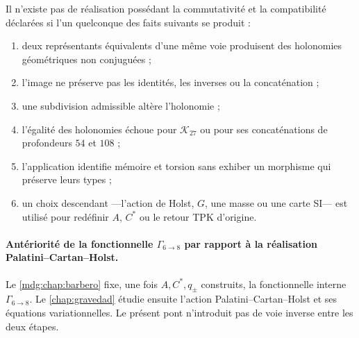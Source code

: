 \begin{criterion}
\label{crit:puente-tpk-cartan}
Il n'existe pas de réalisation possédant la commutativité et la compatibilité déclarées
si l'un quelconque des faits suivants se produit :
\begin{enumerate}
 \item deux représentants équivalents d'une même voie produisent
 des holonomies géométriques non conjuguées ;
 \item l'image ne préserve pas les identités, les inverses ou la concaténation ;
 \item une subdivision admissible altère l'holonomie ;
 \item l'égalité des holonomies échoue pour \(\mathcal K_{27}\) ou pour ses
 concaténations de profondeurs \(54\) et \(108\) ;
 \item l'application identifie mémoire et torsion sans exhiber un morphisme qui
 préserve leurs types ;
 \item un choix descendant ---l'action de Holst, \(G\), une masse ou
 une carte SI--- est utilisé pour redéfinir \(A\), \(C^\ast\) ou le retour
 TPK d'origine.
\end{enumerate}
\end{criterion}

\paragraph{Antériorité de la fonctionnelle \(\Gamma_{6\to8}\) par rapport à la réalisation Palatini--Cartan--Holst.}
Le \cref{mdg:chap:barbero} fixe, une fois \(A,C^\ast,q_\pm\) construits, la
fonctionnelle interne \(\Gamma_{6\to8}\). Le \cref{chap:gravedad} étudie ensuite
l'action Palatini--Cartan--Holst et ses équations variationnelles. Le présent pont
n'introduit pas de voie inverse entre les deux étapes.
